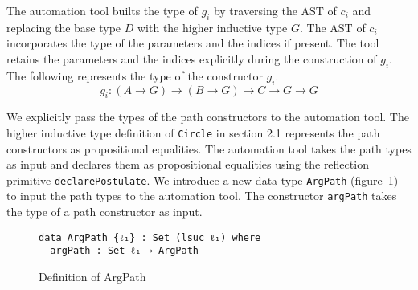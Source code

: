 \documentclass[sigplan,10pt]{acmart}
\begin{document}
The automation tool builts the type of $g_i$ by traversing the AST of $c_i$ and replacing the base type $D$ with the higher inductive type $G$. The AST of $c_i$ incorporates the type of the parameters and the indices if present. The tool retains the parameters and the indices explicitly during the construction of $g_i$. The following represents the type of the constructor $g_i$.
\begin{equation*}
g_i : (A \rightarrow G) \rightarrow (B \rightarrow G) \rightarrow C \rightarrow G \rightarrow G
\end{equation*}

We explicitly pass the types of the path constructors to the automation tool. The higher inductive type definition of {\tt Circle} in section 2.1 represents the path constructors as propositional equalities. The automation tool takes the path types as input and declares them as propositional equalities using the reflection primitive {\tt declarePostulate}. We introduce a new data type {\tt ArgPath} (figure~\ref{fig:argPath}) to input the path types to the automation tool. The constructor {\tt argPath} takes the type of a path constructor as input.

\begin{figure}
\begin{center}
\begingroup
\begin{BVerbatim}
data ArgPath {ℓ₁} : Set (lsuc ℓ₁) where
  argPath : Set ℓ₁ → ArgPath
\end{BVerbatim}
\endgroup
\end{center}
\caption{Definition of ArgPath}
\label{fig:argPath}
\end{figure}
\end{document}
